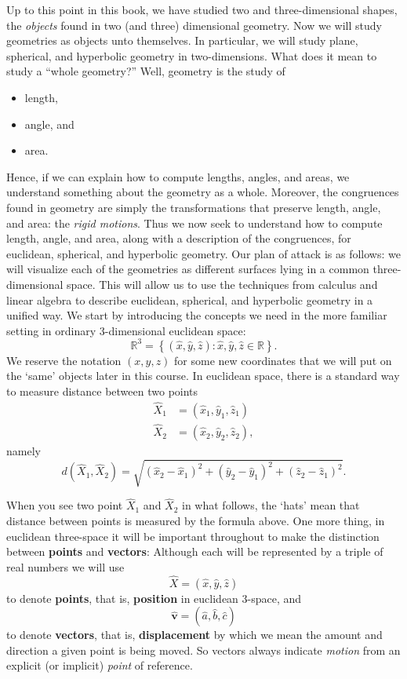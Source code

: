 \documentclass[newpage,hints,handout,nooutcomes,noauthor,12pt]{ximera}
\begin{document}
Up to this point in this book, we have studied two and three-dimensional shapes, the \textit{objects} found in two (and three) dimensional geometry. Now we will study geometries as objects unto themselves. In particular, we will study plane, spherical, and hyperbolic geometry in two-dimensions. What does it mean to study a ``whole geometry?'' Well, geometry is the study of 
\begin{itemize}
\item length,
\item angle, and
\item area.
\end{itemize}
Hence, if we can explain how to compute lengths, angles, and areas, we
understand something about the geometry as a whole. Moreover, the
congruences found in geometry are simply the transformations that
preserve length, angle, and area: the \textit{rigid motions}. Thus we
now seek to understand how to compute length, angle, and area, along
with a description of the congruences, for euclidean, spherical, and
hyperbolic geometry.  Our plan of attack is as follows: we will
visualize each of the geometries as different surfaces lying in a
common three-dimensional space. This will allow us to use the
techniques from calculus and linear algebra to describe euclidean,
spherical, and hyperbolic geometry in a unified way. We start by
introducing the concepts we need in the more familiar setting in
ordinary $3$-dimensional euclidean space:
\[
\mathbb{R}^{3}=\left\{(\hat{x},\hat{y},\hat{z}):
\hat{x},\hat{y},\hat{z} \in \mathbb{R}\right\}.
\]
We reserve the notation $\left( x,y,z\right) $ for some new
coordinates that we will put on the `same' objects later in this
course. In euclidean space, there is a standard way to measure
distance between two points%
\begin{align*}
\hat{X}_{1}  &  =(  \hat{x}_{1},\hat{y}_{1},\hat{z}_{1}) \\
\hat{X}_{2}  &  =(  \hat{x}_{2},\hat{y}_{2},\hat{z}_{2})  ,
\end{align*}
namely%
\[
d(\hat{X}_{1},\hat{X}_{2})=\sqrt{(\hat{x}_{2}-\hat{x}_{1})^{2}+
  (\hat{y}_{2}-\hat{y}_{1})^{2}+(\hat{z}_{2}-\hat{z}_{1})^{2}}. \label{0}%
\]

When you see two point $\hat{X}_1$ and $\hat{X}_2$ in what follows,
the `hats' mean that distance between points is measured by the
formula above. One more thing, in euclidean three-space it will be
important throughout to make the distinction between \textbf{points}
and \textbf{vectors}: Although each will be represented by a triple of
real numbers we will use%
\[
\hat{X}=(\hat{x},\hat{y},\hat{z})
\]
to denote \textbf{points}, that is, \textbf{position} in euclidean $3$-space,
and%
\[
\hat{\mathbf v}=(\hat{a},\hat{b},\hat{c})
\]
to denote \textbf{vectors}, that is, \textbf{displacement} by which we mean
the amount and direction a given point is being moved. So vectors always
indicate \textit{motion} from an explicit (or implicit) \textit{point} of
reference. 
\end{document}
